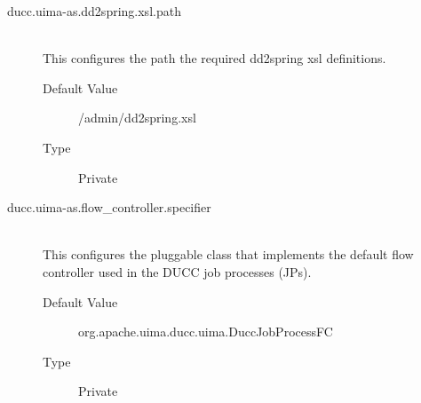 \begin{description}
      \item[ducc.uima-as.dd2spring.xsl.path] \hfill \\
        This configures the path the required dd2spring xsl definitions. 
        \begin{description}
          \item[Default Value] \ducchome/admin/dd2spring.xsl 
          \item[Type] Private 
        \end{description}
        
      \item[ducc.uima-as.flow\_controller.specifier] \hfill \\
        This configures the pluggable class that implements the default flow controller used in the 
        DUCC job processes (JPs). 
        \begin{description}
          \item[Default Value] org.apache.uima.ducc.uima.DuccJobProcessFC 
          \item[Type] Private 
        \end{description}
      \end{description}
      

